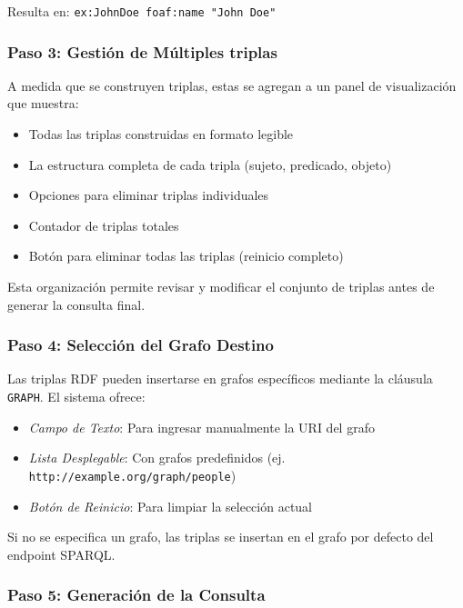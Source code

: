 \documentclass{article}
\begin{document}
Resulta en: \texttt{ex:JohnDoe foaf:name "John Doe"}

\subsubsection{Paso 3: Gestión de Múltiples triplas}
\label{subsubsec:triple-management}

A medida que se construyen triplas, estas se agregan a un panel de visualización que muestra:

\begin{itemize}
    \item Todas las triplas construidas en formato legible
    \item La estructura completa de cada tripla (sujeto, predicado, objeto)
    \item Opciones para eliminar triplas individuales
    \item Contador de triplas totales
    \item Botón para eliminar todas las triplas (reinicio completo)
\end{itemize}

Esta organización permite revisar y modificar el conjunto de triplas antes de generar la consulta final.

\subsubsection{Paso 4: Selección del Grafo Destino}
\label{subsubsec:graph-selection}

Las triplas RDF pueden insertarse en grafos específicos mediante la cláusula \texttt{GRAPH}. El sistema ofrece:

\begin{itemize}
    \item \textit{Campo de Texto}: Para ingresar manualmente la URI del grafo
    \item \textit{Lista Desplegable}: Con grafos predefinidos (ej. \texttt{http://example.org/graph/people})
    \item \textit{Botón de Reinicio}: Para limpiar la selección actual
\end{itemize}

Si no se especifica un grafo, las triplas se insertan en el grafo por defecto del endpoint SPARQL.

\subsubsection{Paso 5: Generación de la Consulta}
\label{subsubsec:query-generation}
\end{document}
